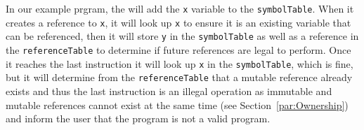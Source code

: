 In our example prgram, the \borrowChecker{} will add the \texttt{x} variable to the
\texttt{symbolTable}. When it creates a reference to \texttt{x}, it will look up \texttt{x} to ensure
it is an existing variable that can be referenced, then it will store \texttt{y} in
the \texttt{symbolTable} as
well as a reference in the \texttt{referenceTable} to determine if future
references are legal to perform. 
Once it reaches the last instruction it will look up \texttt{x} in the
\texttt{symbolTable}, which is fine, but it will determine from the
\texttt{referenceTable} that a mutable reference already exists and thus the last
instruction is an illegal operation as immutable and mutable references cannot
exist at the same time (see Section~\ref{par:Ownership}) and inform
the user that the program is not a valid \lang{} program.
